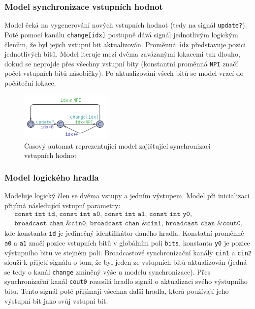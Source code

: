 \subsubsection{Model synchronizace vstupních hodnot}
Model čeká na vygenerování nových vstupních hodnot (tedy na signál \texttt{update?}). Poté pomocí kanálu \texttt{change[idx]} postupně dává signál jednotlivým logickým členům, že byl jejich vstupní bit aktualizován. Proměnná \texttt{idx} představuje pozici jednotlivých bitů. Model iteruje mezi dvěma zavázanými lokacemi tak dlouho, dokud se neprojde přes všechny vstupní bity (konstantní proměnná \texttt{NPI} značí počet vstupních bitů násobičky). Po aktualizování všech bitů se model vrací do počáteční lokace.

\begin{figure}[H]
    \centering
    \includegraphics[width=0.4\textwidth]{obrazky-figures/model_syncPrimary.png}
    \caption{Časový automat reprezentující model zajišťující synchronizaci vstupních hodnot}
    \label{fig:model_syncPrimary}
\end{figure}

\subsubsection{Model logického hradla}
Modeluje logický člen se dvěma vstupy a jedním výstupem. Model při inicializaci přijímá následující vstupní parametry:
\begin{equation*}
    \begin{array}{l}
       \texttt{const int id, const int a0, const int a1, const int y0,} \\
       \texttt{broadcast chan \&cin0, broadcast chan \&cin1, broadcast chan \&cout0,}
    \end{array}
\end{equation*}
kde konstanta \texttt{id} je jedinečný identifikátor daného hradla. Konstatní proměnné \texttt{a0} a \texttt{a1} značí pozice vstupních bitů v globálním poli \texttt{bits}, konstanta \texttt{y0} je pozice výstupního bitu ve stejném poli. Broadcastové synchronizační kanály \texttt{cin1} a \texttt{cin2} slouží k přijetí signálu o tom, že byl jeden ze vstupních bitů aktualizován (jedná se tedy o kanál \texttt{change} zmíněný výše u modelu synchronizace). Přes synchronizační kanál \texttt{cout0} rozesílá hradlo signál o aktualizaci svého výstupního bitu. Tento signál poté přijímají všechna další hradla, která používají jeho výstupní bit jako svůj vstupní bit.

